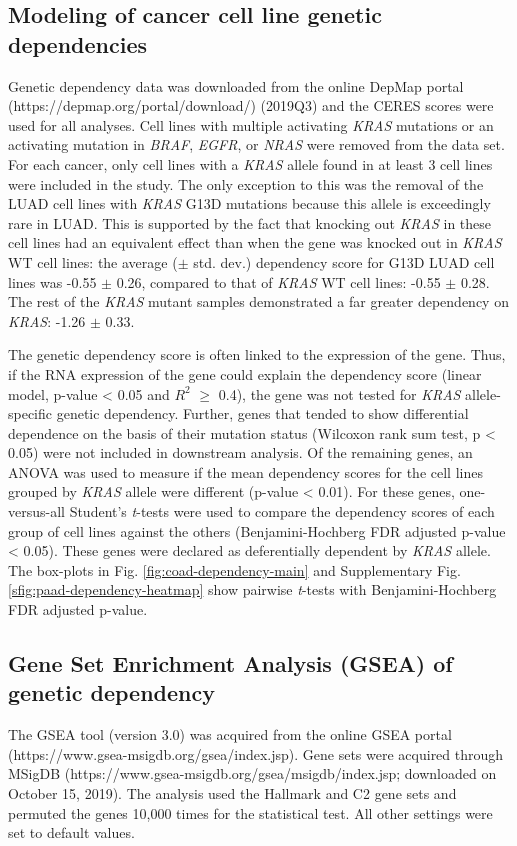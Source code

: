 \documentclass[english, 10pt, letterpaper]{article}
\newcommand{\KRAS}{\emph{KRAS}}
\begin{document}
\subsection*{Modeling of cancer cell line genetic dependencies}
Genetic dependency data was downloaded from the online DepMap portal (https://depmap.org/portal/download/) (2019Q3) and the CERES scores were used for all analyses.
Cell lines with multiple activating \KRAS{} mutations or an activating mutation in \emph{BRAF}, \emph{EGFR}, or \emph{NRAS} were removed from the data set.
For each cancer, only cell lines with a \KRAS{} allele found in at least 3 cell lines were included in the study.
The only exception to this was the removal of the LUAD cell lines with \KRAS{} G13D mutations because this allele is exceedingly rare in LUAD.
This is supported by the fact that knocking out \KRAS{} in these cell lines had an equivalent effect than when the gene was knocked out in \KRAS{} WT cell lines: the average ($\pm$ std. dev.) dependency score for G13D LUAD cell lines was -0.55 $\pm$ 0.26, compared to that of \KRAS{} WT cell lines: -0.55 $\pm$ 0.28. The rest of the \KRAS{} mutant samples demonstrated a far greater dependency on \KRAS{}: -1.26 $\pm$ 0.33.

The genetic dependency score is often linked to the expression of the gene.
Thus, if the RNA expression of the gene could explain the dependency score (linear model, p-value < 0.05 and $R^2$ $\ge$ 0.4), the gene was not tested for \KRAS{} allele-specific genetic dependency.
Further, genes that tended to show differential dependence on the basis of their mutation status (Wilcoxon rank sum test, p < 0.05) were not included in downstream analysis.
Of the remaining genes, an ANOVA was used to measure if the mean dependency scores for the cell lines grouped by \KRAS{} allele were different (p-value < 0.01).
For these genes, one-versus-all Student's \emph{t}-tests were used to compare the dependency scores of each group of cell lines against the others (Benjamini-Hochberg FDR adjusted p-value < 0.05).
These genes were declared as deferentially dependent by \KRAS{} allele.
The box-plots in Fig. \ref{fig:coad-dependency-main} and Supplementary Fig. \ref{sfig:paad-dependency-heatmap} show pairwise \emph{t}-tests with Benjamini-Hochberg FDR adjusted p-value.


\subsection*{Gene Set Enrichment Analysis (GSEA) of genetic dependency}
The GSEA tool (version 3.0) was acquired from the online GSEA portal (https://www.gsea-msigdb.org/gsea/index.jsp).
Gene sets were acquired through MSigDB (https://www.gsea-msigdb.org/gsea/msigdb/index.jsp; downloaded on October 15, 2019).
The analysis used the Hallmark and C2 gene sets and permuted the genes 10,000 times for the statistical test.
All other settings were set to default values.
\end{document}
